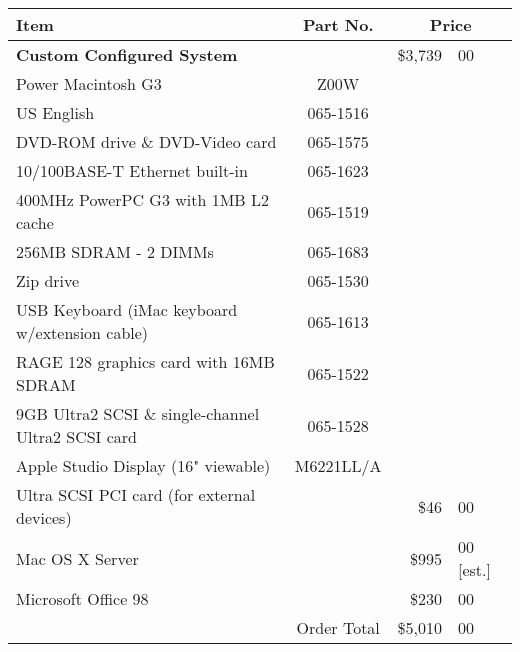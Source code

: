 \begin{table}[htb]
  \begin{center}
    \begin{tabular}{lcr@{.}l}
      Item & Part No. & \multicolumn{2}{c}{Price}\\ \hline
      \large \bf Custom Configured System & & \$3,739 & 00\\
      \hspace{5mm}Power Macintosh G3 & Z00W & \multicolumn{2}{c}{} \\
      \hspace{5mm}US English & 065-1516 & \multicolumn{2}{c}{} \\
      \hspace{5mm}DVD-ROM drive \& DVD-Video card & 065-1575 & \multicolumn{2}{c}{} \\
      \hspace{5mm}10/100BASE-T Ethernet built-in & 065-1623 & \multicolumn{2}{c}{} \\
      \hspace{5mm}400MHz PowerPC G3 with 1MB L2 cache & 065-1519 & \multicolumn{2}{c}{} \\
      \hspace{5mm}256MB SDRAM - 2 DIMMs & 065-1683 & \multicolumn{2}{c}{} \\
      \hspace{5mm}Zip drive & 065-1530 & \multicolumn{2}{c}{} \\
      \hspace{5mm}USB Keyboard (iMac keyboard w/extension cable) & 065-1613 & \multicolumn{2}{c}{} \\
      \hspace{5mm}RAGE 128 graphics card with 16MB SDRAM & 065-1522 & \multicolumn{2}{c}{} \\
      \hspace{5mm}9GB Ultra2 SCSI \& single-channel Ultra2 SCSI card & 065-1528 & \multicolumn{2}{c}{} \\
      \hspace{5mm}Apple Studio Display (16" viewable) & M6221LL/A & \multicolumn{2}{c}{} \\
      Ultra SCSI PCI card (for external devices) & & \$46 & 00 \\
      Mac OS X Server & & \$995 & 00 [est.] \\
      Microsoft Office 98 & & \$230 & 00 \\ \hline
      & Order Total & \$5,010 & 00\\
    \end{tabular}
  \end{center}
\end{table}

